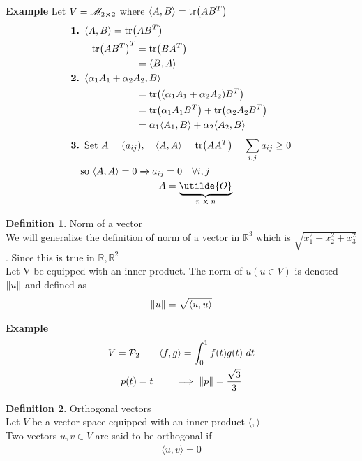 \documentclass[
12pt,
]{article}
\newcommand{\ex}{\textbf{Example}}
\newcommand{\la}{\langle}
\newcommand{\ra}{\rangle}
\DeclarePairedDelimiter{\norm}{\lVert}{\rVert}
\theoremstyle{definition}
\theoremstyle{definition}
\theoremstyle{definition}
\newtheorem{Definition}{Definition}[section]
\theoremstyle{definition}
\begin{document}
\textbf{Example } Let $V = \mathscr{M}_{2\cross 2}$ where $ \la  A,B\ra = \tr(AB^{T})$
\begin{align*}
	&\textbf{1. }  \la  A,B\ra = \tr(AB^{T}) \\
	& \qquad \tr(AB^{T})^{T} = \tr(BA^{T}) \\
	& \hspace{67pt} =  \la  B,A\ra \\
	& \textbf{2. }  \la  \alpha_1 A_1 + \alpha_2 A_2, B\ra  \\
	&\hspace{67pt} = \tr((\alpha_1 A_1 + \alpha_2 A_2)B^{T}) \\
	&\hspace{67pt} = \tr(\alpha_1 A_1 B^{T}) + \tr(\alpha_2 A_2 B^{T}) \\
	&\hspace{67pt} =\alpha_1  \la  A_1 , B\ra + \alpha_2 \la  A_2 , B  \ra \\ 
	&\textbf{3. } \text{Set } A = (a_{ij}) , \quad  \la  A,A\ra = \tr(AA^{T}) = \sum_{i,j}^{} a_{ij} \geq 0 \\
	&\quad \text{so }  \la  A,A\ra = 0 \xrightarrow{} a_{ij} = 0 \quad \forall i,j\\
	&\hspace{90pt} A = \underbrace{\utilde{O}}_\text{$n\cross n$}
\end{align*}
\begin{Definition}{Norm of a vector} \\
	We will generalize the definition of norm of a vector in $\mathbb{R}^3$ which is $\sqrt{x_{1}^2 + x_{2}^2 +x_{3}^2}$. Since this is true in $\mathbb{R}, \mathbb{R}^2$ \\ 
	Let V be equipped with an inner product. The norm of $u (u\in V)$ is denoted $\norm{u}$ and defined as 
	\begin{gather*}
		\norm{u} = \sqrt{ \la  u,u \ra } 
	\end{gather*}
\end{Definition}
\ex
\begin{gather*}
	V  = \mathcal{P}_2 \qquad  \la  f,g\ra = \int_{0}^{1} f(t) g(t) \ dt \\
	p(t) = t \qquad \implies \norm{p} = \frac{\sqrt{3}}{3}
\end{gather*}
\begin{Definition}{Orthogonal vectors} \\
	Let $V$ be a vector space equipped with an inner product $ \la  , \ra $ \\
	Two vectors $u,v \in V$ are said to be orthogonal if \\
	\begin{gather*}
		 \la  u,v\ra = 0
	\end{gather*}
\end{Definition}
\end{document}

